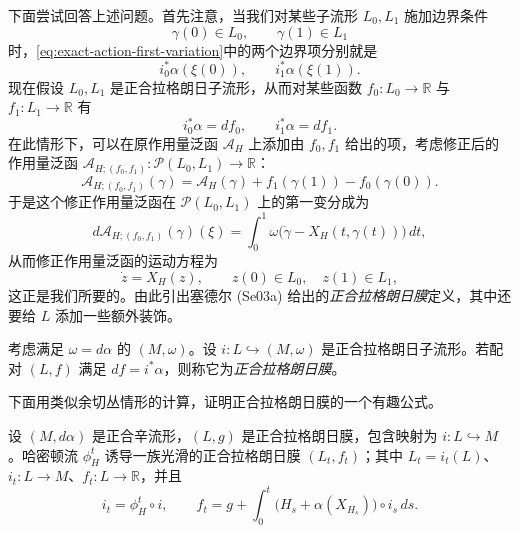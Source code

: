 下面尝试回答上述问题。首先注意，当我们对某些子流形 $L_0,L_1$ 施加边界条件
\[
 \gamma(0)\in L_0,\qquad\gamma(1)\in L_1
\]
时，\eqref{eq:exact-action-first-variation}中的两个边界项分别就是
\[
 i_0^*\alpha(\xi(0)),\qquad i_1^*\alpha(\xi(1)).
\]
现在假设 $L_0,L_1$ 是正合拉格朗日子流形，从而对某些函数
$f_0:L_0\to\mathbb R$ 与 $f_1:L_1\to\mathbb R$ 有
\[
 i_0^*\alpha=df_0,\qquad i_1^*\alpha=df_1.
\]
在此情形下，可以在原作用量泛函 $\mathcal A_H$ 上添加由 $f_0,f_1$ 给出的项，考虑修正后的作用量泛函
$\mathcal A_{H;(f_0,f_1)}:\mathcal P(L_0,L_1)\to\mathbb R$：
\begin{equation}
 \mathcal A_{H;(f_0,f_1)}(\gamma)
 =\mathcal A_H(\gamma)+f_1(\gamma(1))-f_0(\gamma(0)).
 \label{eq:modified-exact-action}
\end{equation}
于是这个修正作用量泛函在 $\mathcal P(L_0,L_1)$ 上的第一变分成为
\[
 d\mathcal A_{H;(f_0,f_1)}(\gamma)(\xi)
 =\int_0^1\omega\bigl(\dot\gamma-X_H(t,\gamma(t))\bigr)\,dt,
\]
从而修正作用量泛函的运动方程为
\[
 \dot z=X_H(z),\qquad z(0)\in L_0,\quad z(1)\in L_1,
\]
这正是我们所要的。由此引出塞德尔 (Se03a) 给出的\emph{正合拉格朗日膜}定义，其中还要给 $L$ 添加一些额外装饰。

\begin{definition}[正合拉格朗日膜]\label{def:exact-lagrangian-brane}
考虑满足 $\omega=d\alpha$ 的 $(M,\omega)$。设
$i:L\hookrightarrow(M,\omega)$ 是正合拉格朗日子流形。若配对 $(L,f)$ 满足
$df=i^*\alpha$，则称它为\emph{正合拉格朗日膜}。
\end{definition}

下面用类似余切丛情形的计算，证明正合拉格朗日膜的一个有趣公式。

\begin{proposition}\label{prop:hamiltonian-flow-exact-brane}
设 $(M,d\alpha)$ 是正合辛流形，$(L,g)$ 是正合拉格朗日膜，包含映射为
$i:L\hookrightarrow M$。哈密顿流 $\phi_H^t$ 诱导一族光滑的正合拉格朗日膜 $(L_t,f_t)$；其中 $L_t=i_t(L)$、$i_t:L\to M$、$f_t:L\to\mathbb R$，并且
\begin{equation}
 i_t=\phi_H^t\circ i,\qquad
 f_t=g+\int_0^t\bigl(H_s+\alpha(X_{H_s})\bigr)\circ i_s\,ds.
 \label{eq:hamiltonian-deformed-brane-phase}
\end{equation}
\end{proposition}

